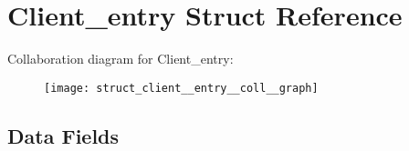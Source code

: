 \hypertarget{struct_client__entry}{\section{Client\+\_\+entry Struct Reference}
\label{struct_client__entry}
}


Collaboration diagram for Client\+\_\+entry\+:\nopagebreak
\begin{figure}[H]
\begin{center}
\leavevmode
\texttt{[image: struct\_client\_\_entry\_\_coll\_\_graph]}
\end{center}
\end{figure}
\subsection*{Data Fields}
